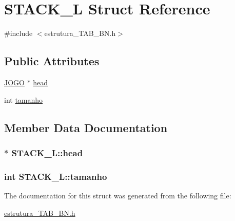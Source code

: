 \hypertarget{structSTACK__L}{\section{S\-T\-A\-C\-K\-\_\-\-L Struct Reference}
\label{structSTACK__L}
}


{\ttfamily \#include $<$estrutura\-\_\-\-T\-A\-B\-\_\-\-B\-N.\-h$>$}

\subsection*{Public Attributes}
\begin{DoxyCompactItemize}
\item 
\hyperlink{structJOGO}{J\-O\-G\-O} $\ast$ \hyperlink{structSTACK__L_a69c7e0a8504ed82dd11589aa0c714023}{head}
\item 
int \hyperlink{structSTACK__L_ac478e0116a0c43b0f3a69999d8ed4a13}{tamanho}
\end{DoxyCompactItemize}


\subsection{Member Data Documentation}
\hypertarget{structSTACK__L_a69c7e0a8504ed82dd11589aa0c714023}{
\subsubsection[{head}]{$\ast$ S\-T\-A\-C\-K\-\_\-\-L\-::head}}\label{structSTACK__L_a69c7e0a8504ed82dd11589aa0c714023}
\hypertarget{structSTACK__L_ac478e0116a0c43b0f3a69999d8ed4a13}{
\subsubsection[{tamanho}]{\setlength{\rightskip}{0pt plus 5cm}int S\-T\-A\-C\-K\-\_\-\-L\-::tamanho}}\label{structSTACK__L_ac478e0116a0c43b0f3a69999d8ed4a13}


The documentation for this struct was generated from the following file\-:\begin{DoxyCompactItemize}
\item 
\hyperlink{estrutura__TAB__BN_8h}{estrutura\-\_\-\-T\-A\-B\-\_\-\-B\-N.\-h}\end{DoxyCompactItemize}
